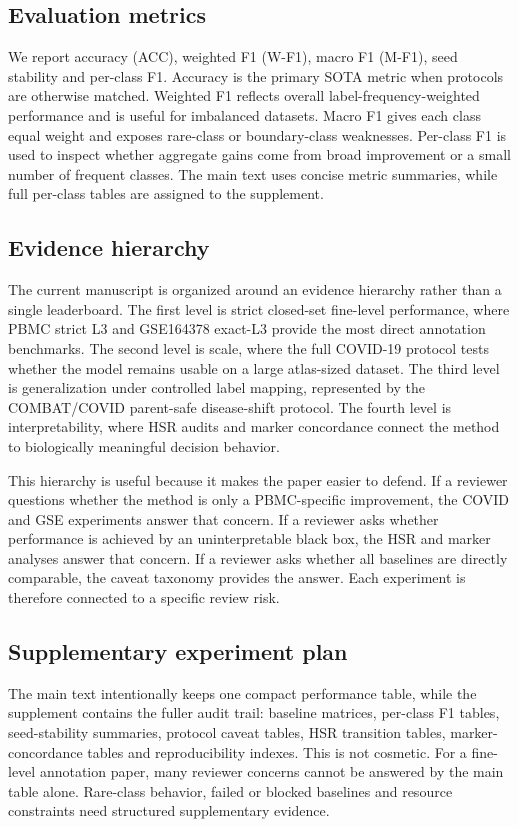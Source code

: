 \documentclass[unnumsec,webpdf,contemporary,large,numbered]{oup-authoring-template}
\begin{document}
\subsection{Evaluation metrics}

We report accuracy (ACC), weighted F1 (W-F1), macro F1 (M-F1), seed stability and per-class F1. Accuracy is the primary SOTA metric when protocols are otherwise matched. Weighted F1 reflects overall label-frequency-weighted performance and is useful for imbalanced datasets. Macro F1 gives each class equal weight and exposes rare-class or boundary-class weaknesses. Per-class F1 is used to inspect whether aggregate gains come from broad improvement or a small number of frequent classes. The main text uses concise metric summaries, while full per-class tables are assigned to the supplement.

\subsection{Evidence hierarchy}

The current manuscript is organized around an evidence hierarchy rather than a single leaderboard. The first level is strict closed-set fine-level performance, where PBMC strict L3 and GSE164378 exact-L3 provide the most direct annotation benchmarks. The second level is scale, where the full COVID-19 protocol tests whether the model remains usable on a large atlas-sized dataset. The third level is generalization under controlled label mapping, represented by the COMBAT/COVID parent-safe disease-shift protocol. The fourth level is interpretability, where HSR audits and marker concordance connect the method to biologically meaningful decision behavior.

This hierarchy is useful because it makes the paper easier to defend. If a reviewer questions whether the method is only a PBMC-specific improvement, the COVID and GSE experiments answer that concern. If a reviewer asks whether performance is achieved by an uninterpretable black box, the HSR and marker analyses answer that concern. If a reviewer asks whether all baselines are directly comparable, the caveat taxonomy provides the answer. Each experiment is therefore connected to a specific review risk.

\subsection{Supplementary experiment plan}

The main text intentionally keeps one compact performance table, while the supplement contains the fuller audit trail: baseline matrices, per-class F1 tables, seed-stability summaries, protocol caveat tables, HSR transition tables, marker-concordance tables and reproducibility indexes. This is not cosmetic. For a fine-level annotation paper, many reviewer concerns cannot be answered by the main table alone. Rare-class behavior, failed or blocked baselines and resource constraints need structured supplementary evidence.
\end{document}
